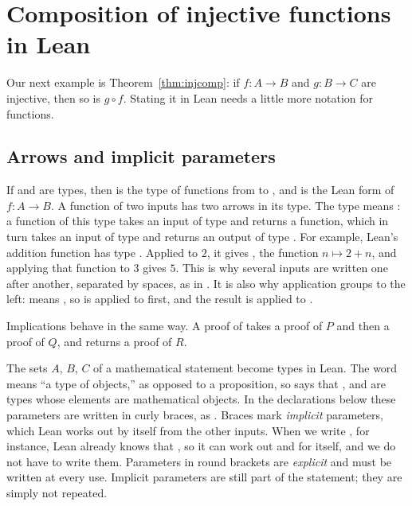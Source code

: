 \section{Composition of injective functions in Lean}\label{ch15:sec:injcomp}
Our next example is Theorem~\ref{thm:injcomp}: if $f:A\to B$ and $g:B\to C$ are injective, then so is $g\circ f$. Stating it in Lean needs a little more notation for functions.

\subsection*{Arrows and implicit parameters}
If  and  are types, then  is the type of functions from  to , and  is the Lean form of $f:A\to B$. A function of two inputs has two arrows in its type. The type  means : a function of this type takes an input of type  and returns a function, which in turn takes an input of type  and returns an output of type . For example, Lean's addition function  has type . Applied to $2$, it gives , the function $n\mapsto 2+n$, and applying that function to $3$ gives $5$. This is why several inputs are written one after another, separated by spaces, as in . It is also why application groups to the left:  means , so  is applied to  first, and the result is applied to .

Implications behave in the same way. A proof of  takes a proof of $P$ and then a proof of $Q$, and returns a proof of $R$.

The sets $A$, $B$, $C$ of a mathematical statement become types in Lean. The word  means ``a type of objects,'' as opposed to a proposition, so  says that ,  and  are types whose elements are mathematical objects. In the declarations below these parameters are written in curly braces, as . Braces mark \emph{implicit} parameters, which Lean works out by itself from the other inputs. When we write , for instance, Lean already knows that , so it can work out  and  for itself, and we do not have to write them. Parameters in round brackets are \emph{explicit} and must be written at every use. Implicit parameters are still part of the statement; they are simply not repeated.

